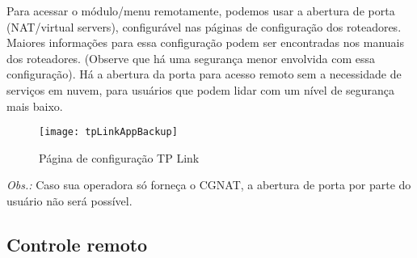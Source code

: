 Para acessar o módulo/menu remotamente, podemos usar a abertura de porta (NAT/virtual servers), configurável nas páginas de configuração dos roteadores. Maiores informações para essa configuração podem ser encontradas nos manuais dos roteadores. (Observe que há uma segurança menor envolvida com essa configuração). Há a abertura da porta para acesso remoto sem a necessidade de serviços em nuvem, para usuários que podem lidar com um nível de segurança mais baixo.

\begin{figure}[hbp]
    \centering
    \caption{Página de configuração TP Link}
    \texttt{[image: tpLinkAppBackup]}
    \label{fig:tpLinkAppBackup}
\end{figure}

\emph{Obs.:} Caso sua operadora só forneça o CGNAT, a abertura de porta por parte do usuário não será possível.

\subsection{Controle remoto}

